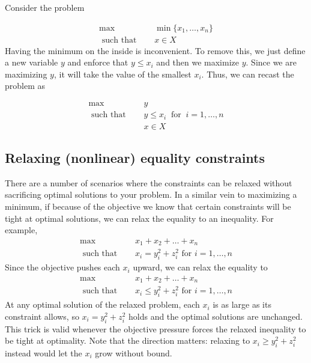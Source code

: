 Consider the problem 

\begin{align*}
\max   \quad & \min \{x_1, \dots, x_n\}\\
\text{ such that } \quad &  x \in X
\end{align*}
Having the minimum on the inside is inconvenient.  To remove this, we just define a new variable $y$ and enforce that $y \leq x_i$ and then we maximize $y$.  Since we are maximizing $y$, it will take the value of the smallest $x_i$.  Thus, we can recast the problem as

\begin{align*}
\max\quad    & y\\
\text{ such that } \quad  & y \leq x_i \ \text{ for }\  i=1, \dots, n \\
&  x \in X
\end{align*}


\subsection{Relaxing (nonlinear) equality constraints}

There are a number of scenarios where the constraints can be relaxed without sacrificing optimal solutions to your problem.   In a similar vein to maximizing a minimum, if because of the objective we know that certain constraints will be tight at optimal solutions, we can relax the equality to an inequality.   For example, 
\begin{align*}
\max   \quad &x_1 + x_2 +  \dots + x_n\\
\text{ such that } \quad &  x_i = y_i^2 + z_i^2 \text{ for } i=1, \dots, n
\end{align*}
Since the objective pushes each $x_i$ upward, we can relax the equality to
\begin{align*}
\max   \quad &x_1 + x_2 +  \dots + x_n\\
\text{ such that } \quad &  x_i \leq y_i^2 + z_i^2 \text{ for } i=1, \dots, n
\end{align*}
At any optimal solution of the relaxed problem, each $x_i$ is as large as its constraint allows, so $x_i = y_i^2 + z_i^2$ holds and the optimal solutions are unchanged.  This trick is valid whenever the objective pressure forces the relaxed inequality to be tight at optimality.  Note that the direction matters: relaxing to $x_i \geq y_i^2 + z_i^2$ instead would let the $x_i$ grow without bound.






